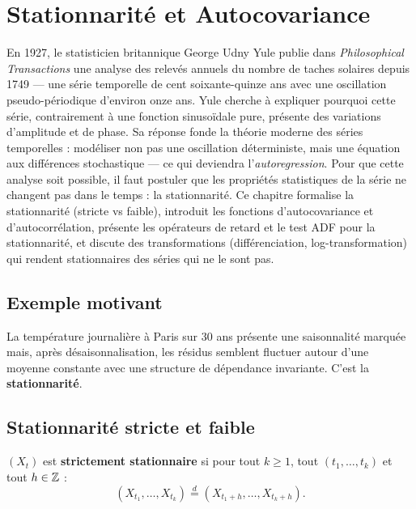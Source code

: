 \chapter{Stationnarit\'e et Autocovariance}
\label{ch:stationnarite}

En 1927, le statisticien britannique George Udny Yule publie dans \emph{Philosophical Transactions} une analyse des relevés annuels du nombre de taches solaires depuis 1749 --- une série temporelle de cent soixante-quinze ans avec une oscillation pseudo-périodique d'environ onze ans. Yule cherche à expliquer pourquoi cette série, contrairement à une fonction sinusoïdale pure, présente des variations d'amplitude et de phase. Sa réponse fonde la théorie moderne des séries temporelles : modéliser non pas une oscillation déterministe, mais une équation aux différences stochastique --- ce qui deviendra l'\emph{autoregression}. Pour que cette analyse soit possible, il faut postuler que les propriétés statistiques de la série ne changent pas dans le temps : la stationnarité. Ce chapitre formalise la stationnarité (stricte vs faible), introduit les fonctions d'autocovariance et d'autocorrélation, présente les opérateurs de retard et le test ADF pour la stationnarité, et discute des transformations (différenciation, log-transformation) qui rendent stationnaires des séries qui ne le sont pas.

\section{Exemple motivant}
La temp\'erature journali\`ere \`a Paris sur 30 ans pr\'esente une saisonnalit\'e marqu\'ee mais, apr\`es d\'esaisonnalisation, les r\'esidus semblent fluctuer autour d'une moyenne constante avec une structure de d\'ependance invariante. C'est la \textbf{stationnarit\'e}.

\section{Stationnarit\'e stricte et faible}

\begin{definition}
$(X_t)$ est \textbf{strictement stationnaire} si pour tout $k\geq 1$, tout $(t_1,\ldots,t_k)$ et tout $h\in\mathbb{Z}$ :
\[
(X_{t_1},\ldots,X_{t_k}) \stackrel{d}{=} (X_{t_1+h},\ldots,X_{t_k+h}).
\]
\end{definition}

